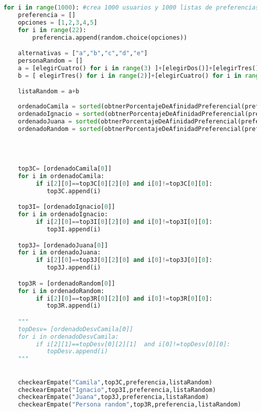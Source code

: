 \documentclass[a4paper]{article}
\begin{document}
\begin{lstlisting}[language = Python]
for i in range(1000): #crea 1000 usuarios y 1000 listas de preferencias random para buscar empates
    preferencia = []
    opciones = [1,2,3,4,5]
    for i in range(22):
        preferencia.append(random.choice(opciones))

    alternativas = ["a","b","c","d","e"]
    personaRandom = []
    a = [elegirCuatro() for i in range(3) ]+[elegirDos()]+[elegirTres()]+[elegirCuatro()]+[elegirCinco()]+[elegirCuatro()]+[elegirDos() for i in range(2)]+[elegirCuatro() for i in range(3)]
    b = [ elegirTres() for i in range(2)]+[elegirCuatro() for i in range(3)]+[elegirCinco()]+[ elegirTres() for i in range(2)]+[elegirCuatro()]

    listaRandom = a+b
    
    ordenadoCamila = sorted(obtnerPorcentajeDeAfinidadPreferencial(preferencia,listaRandom)[1], key = lambda x: x[2][0], reverse=True)
    ordenadoIgnacio = sorted(obtnerPorcentajeDeAfinidadPreferencial(preferencia,listaRandom)[2], key = lambda x: x[2][0], reverse=True)
    ordenadoJuana = sorted(obtnerPorcentajeDeAfinidadPreferencial(preferencia,listaRandom)[3], key = lambda x: x[2][0], reverse=True)
    ordenadoRandom = sorted(obtnerPorcentajeDeAfinidadPreferencial(preferencia,listaRandom)[0], key = lambda x: x[2][0], reverse=True)
     



    top3C= [ordenadoCamila[0]]
    for i in ordenadoCamila:
         if i[2][0]==top3C[0][2][0] and i[0]!=top3C[0][0]:
            top3C.append(i)

    top3I= [ordenadoIgnacio[0]]
    for i in ordenadoIgnacio:
         if i[2][0]==top3I[0][2][0] and i[0]!=top3I[0][0]:
            top3I.append(i)

    top3J= [ordenadoJuana[0]]
    for i in ordenadoJuana:
         if i[2][0]==top3J[0][2][0] and i[0]!=top3J[0][0]:
            top3J.append(i)

    top3R = [ordenadoRandom[0]]
    for i in ordenadoRandom:
         if i[2][0]==top3R[0][2][0] and i[0]!=top3R[0][0]:
            top3R.append(i)

    """
    topDesv= [ordenadoDesvCamila[0]]
    for i in ordenadoDesvCamila:
         if i[2][1]==topDesv[0][2][1]  and i[0]!=topDesv[0][0]:
            topDesv.append(i)          
    """
    

    checkearEmpate("Camila",top3C,preferencia,listaRandom)
    checkearEmpate("Ignacio",top3I,preferencia,listaRandom)
    checkearEmpate("Juana",top3J,preferencia,listaRandom)
    checkearEmpate("Persona random",top3R,preferencia,listaRandom)

\end{lstlisting}
\end{document}
